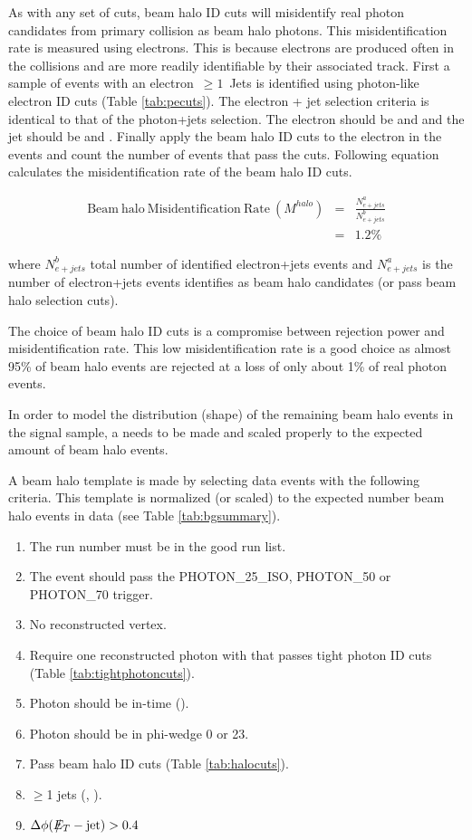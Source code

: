 \documentclass[11pt]{article}
\begin{document}
As with any set of cuts, beam halo ID cuts will misidentify real photon candidates from primary collision as beam halo photons. This misidentification rate is measured using electrons. This is because electrons are produced often in the collisions and are more readily identifiable by their associated track. First a sample of events with an electron~$\geq 1$~Jets is identified using photon-like electron ID cuts (Table \ref{tab:pecuts}). The electron + jet selection criteria is identical to that of the photon+jets selection. The electron should be  and  and the jet should be  and . Finally apply the beam halo ID cuts to the electron in the events and count the number of events that pass the cuts. Following equation calculates the misidentification rate of the beam halo ID cuts.

\begin{eqnarray}
\mathrm{Beam~halo~Misidentification~Rate}~(M^{halo}) &=& \frac{N_{e+jets}^{a}}{N_{e+jets}^{b}}\\
 &=& 1.2\% \nonumber
\label{eqa:HaloMisIdRate}
\end{eqnarray}

\noindent where $N_{e+jets}^{b}$ total number of identified electron+jets events and $N_{e+jets}^{a}$ is the number of electron+jets events identifies as beam halo candidates (or pass beam halo selection cuts).

The choice of beam halo ID cuts is a compromise between rejection power and misidentification rate. This low misidentification rate is a good choice as almost 95\% of beam halo events are rejected at a loss of only about 1\% of real photon events.

In order to model the distribution (shape) of the remaining beam halo events in the signal sample, a  needs to be made and scaled properly to the expected amount of beam halo events.

A beam halo template is made by selecting data events with the following criteria. This template is normalized (or scaled) to the expected number beam halo events in data (see Table \ref{tab:bgsummary}).

\begin{enumerate}
 \item The run number must be in the good run list.
 \item The event should pass the PHOTON\_25\_ISO, PHOTON\_50 or \mbox{PHOTON\_70} trigger.
 \item No reconstructed vertex.
 \item Require one reconstructed photon with  that passes tight photon ID cuts (Table \ref{tab:tightphotoncuts}).
 \item Photon should be in-time (\intimewindow).
 \item Photon should be in phi-wedge 0 or 23.
 \item Pass beam halo ID cuts (Table \ref{tab:halocuts}).
 \item $\geq$1 jets (, ).
 \item $\Delta \phi(\met - \mathrm{jet})>0.4$
\end{enumerate}
\end{document}
